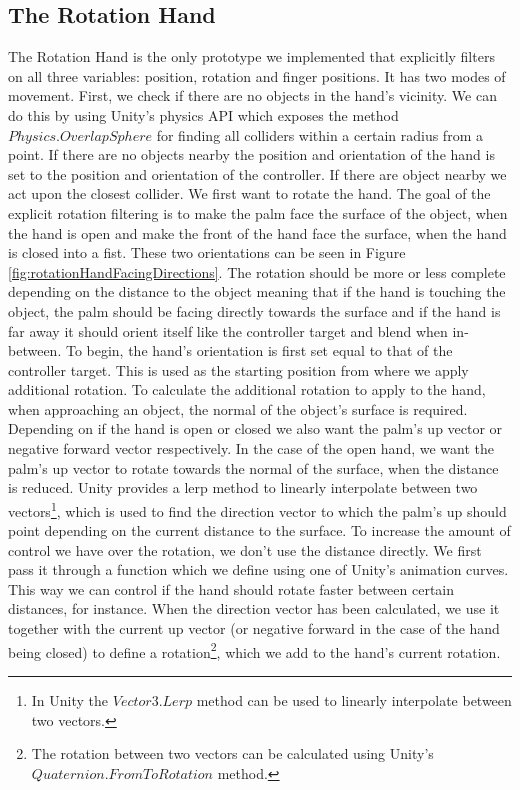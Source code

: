 \subsection{The Rotation Hand}
\label{subsec:rotationHand}
The Rotation Hand is the only prototype we implemented that explicitly filters on all three variables: position, rotation and finger positions. It has two modes of movement. First, we check if there are no objects in the hand's vicinity. We can do this by using Unity's physics API which exposes the method $Physics.OverlapSphere$ for finding all colliders within a certain radius from a point. If there are no objects nearby the position and orientation of the hand is set to the position and orientation of the controller. If there are object nearby we act upon the closest collider. We first want to rotate the hand. The goal of the explicit rotation filtering is to make the palm face the surface of the object, when the hand is open and make the front of the hand face the surface, when the hand is closed into a fist. These two orientations can be seen in Figure \ref{fig:rotationHandFacingDirections}. The rotation should be more or less complete depending on the distance to the object meaning that if the hand is touching the object, the palm should be facing directly towards the surface and if the hand is far away it should orient itself like the controller target and blend when in-between. To begin, the hand's orientation is first set equal to that of the controller target. This is used as the starting position from where we apply additional rotation. To calculate the additional rotation to apply to the hand, when approaching an object, the normal of the object's surface is required. Depending on if the hand is open or closed we also want the palm's up vector or negative forward vector respectively. In the case of the open hand, we want the palm's up vector to rotate towards the normal of the surface, when the distance is reduced. Unity provides a lerp method to linearly interpolate between two vectors\footnote{In Unity the $Vector3.Lerp$ method can be used to linearly interpolate between two vectors.}, which is used to find the direction vector to which the palm's up should point depending on the current distance to the surface. To increase the amount of control we have over the rotation, we don't use the distance directly. We first pass it through a function which we define using one of Unity's animation curves. This way we can control if the hand should rotate faster between certain distances, for instance. When the direction vector has been calculated, we use it together with the current up vector (or negative forward in the case of the hand being closed) to define a rotation\footnote{The rotation between two vectors can be calculated using Unity's $Quaternion.FromToRotation$ method.}, which we add to the hand's current rotation.

